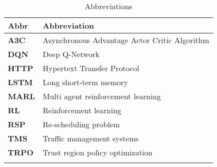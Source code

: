 \begin{longtable}{|m{3cm}|m{11cm}|}\hline	
	\rowcolor{gray} \textbf{Abbr}&
	Abbreviation \\ \hline

	\textbf{A3C}&
	Asynchronous Advantage Actor Critic Algorithm \\ \hline

	\textbf{DQN}&
	Deep Q-Network \\ \hline

	\textbf{HTTP}&
	Hypertext Transfer Protocol \\ \hline

	\textbf{LSTM}&
	Long short-term memory \\ \hline

	\textbf{MARL}&
	Multi agent reinforcement learning \\ \hline

	\textbf{RL}&
	Reinforcement learning \\ \hline

	\textbf{RSP}&
	Re-scheduling problem \\ \hline

	\textbf{TMS}&
	Traffic management systems \\ \hline

	\textbf{TRPO}&
	Trust region policy optimization \\ \hline

\caption{Abbreviations}
\label{tab:abkuerzungsverzeichnis}
\end{longtable}
